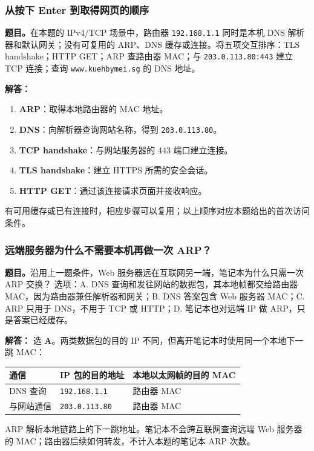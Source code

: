 \documentclass[11pt,a4paper,fontset=fandol]{ctexart}
\renewcommand{\exercisequestion}[2]{%
  \Needspace{5\baselineskip}%
  \subsubsection{#2}\label{exercise:#1}%
}
\renewenvironment{checkedsolution}
  {\par\nopagebreak[4]\textbf{解答：}\ignorespaces}
  {\par}
\begin{document}
\exercisequestion{SC2008-HW06-Q16}{从按下 Enter 到取得网页的顺序}
\textbf{题目。}在本题的 IPv4/TCP 场景中，路由器 \texttt{192.168.1.1} 同时是本机 DNS 解析器和默认网关；没有可复用的 ARP、DNS 缓存或连接。将五项交互排序：TLS handshake；HTTP GET；ARP 查路由器 MAC；与 \texttt{203.0.113.80:443} 建立 TCP 连接；查询 \texttt{www.kuehbymei.sg} 的 DNS 地址。
\begin{checkedsolution}
\begin{enumerate}
  \item \textbf{ARP}：取得本地路由器的 MAC 地址。
  \item \textbf{DNS}：向解析器查询网站名称，得到 \texttt{203.0.113.80}。
  \item \textbf{TCP handshake}：与网站服务器的 443 端口建立连接。
  \item \textbf{TLS handshake}：建立 HTTPS 所需的安全会话。
  \item \textbf{HTTP GET}：通过该连接请求页面并接收响应。
\end{enumerate}
有可用缓存或已有连接时，相应步骤可以复用；以上顺序对应本题给出的首次访问条件。
\end{checkedsolution}

\exercisequestion{SC2008-HW06-Q17}{远端服务器为什么不需要本机再做一次 ARP？}
\textbf{题目。}沿用上一题条件，Web 服务器远在互联网另一端，笔记本为什么只需一次 ARP 交换？
选项：A. DNS 查询和发往网站的数据包，其本地帧都交给路由器 MAC，因为路由器兼任解析器和网关；B. DNS 答案包含 Web 服务器 MAC；C. ARP 只用于 DNS，不用于 TCP 或 HTTP；D. 笔记本也对远端 IP 做 ARP，只是答案已经缓存。
\begin{checkedsolution}
选 \textbf{A}。两类数据包的目的 IP 不同，但离开笔记本时使用同一个本地下一跳 MAC：
\begin{center}
\small
\begin{tabular}{@{}lll@{}}
\toprule
通信 & IP 包的目的地址 & 本地以太网帧的目的 MAC \\
\midrule
DNS 查询 & \texttt{192.168.1.1} & 路由器 MAC \\
与网站通信 & \texttt{203.0.113.80} & 路由器 MAC \\
\bottomrule
\end{tabular}
\end{center}
ARP 解析本地链路上的下一跳地址。笔记本不会跨互联网查询远端 Web 服务器的 MAC；路由器后续如何转发，不计入本题的笔记本 ARP 次数。
\end{checkedsolution}
\end{document}
